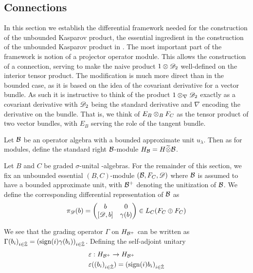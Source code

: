 \subsection{Connections}
In this section we establish the differential framework needed for the construction of the unbounded Kasparov product, the essential ingredient in the construction of the unbounded Kasparov product in \cite{mesland}. The most important part of the framework is notion of a projector operator module. This allows the construction of a connection, serving to make the naive product $1\otimes \mathscr{D}_2$ well-defined on the interior tensor product. The modification is much more direct than in the bounded case, as it is based on the idea of the covariant derivative for a vector bundle. As such it is instructive to think of the product $1\otimes_{\nabla}\mathscr{D}_2$ exactly as a covariant derivative with $\mathscr{D}_2$ being the standard derivative and $\nabla$ encoding the derivative on the bundle. That is, we think of $E_B\otimes_B F_C$ as the tensor product of two vector bundles, with $E_B$ serving the role of the tangent bundle.
\begin{definition}
Let $\mathcal{B}$ be an operator algebra with a bounded approximate unit $u_\lambda$. Then as for \Cstar modules, define the standard right $\mathcal{B}$-module $H_{\mathcal{B}}=H\widetilde{\otimes} \mathcal{B}$.
\end{definition}
\begin{assumption}
	Let $B$ and $C$ be graded $\sigma$-unital \Cstar-algebras.
	For the remainder of this section, we fix an unbounded essential $(B,C)$-module $(\mathcal{B},F_C,\mathscr{D})$ where $\mathcal{B}$ is assumed to have a bounded approximate unit, with $\mathcal{B}^+$ denoting the unitization of $\mathcal{B}$.
	We define the corresponding differential representation of $\mathcal{B}$ as 
	\begin{align*}
		\pi_{\D}(b)=\begin{pmatrix} b & 0 \\ [\D,b] & \gamma(b) \end{pmatrix} \in L_C(F_C\osum F_C)
	\end{align*}
\end{assumption}
We see that the grading operator $\Gamma$ on $H_{\mathcal{B}^+}$ can be written as $\Gamma(b_i)_{i\in \hat{\mathbb{Z}}}=(\operatorname{sign}(i)\gamma(b_i))_{i\in \hat{\mathbb{Z}}}$. Defining the self-adjoint unitary 
\begin{align*}
	&\varepsilon:H_{\mathcal{B}^+}\to H_{\mathcal{B}^+} \\
	&\varepsilon((b_i)_{i\in \hat{\mathbb{Z}}})=(\operatorname{sign}(i)b_i)_{i\in \hat{\mathbb{Z}}}
\end{align*}
